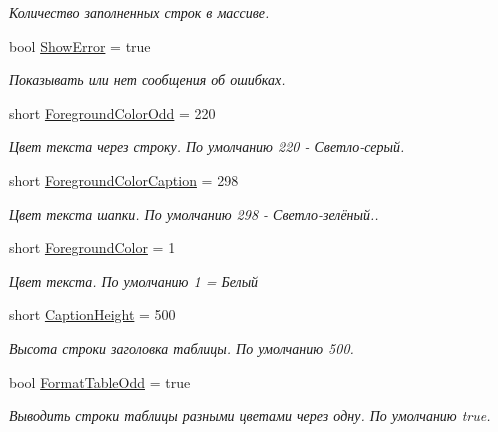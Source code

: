 \begin{DoxyCompactItemize}
\begin{DoxyCompactList}\small\item\em Количество заполненных строк в массиве. \end{DoxyCompactList}\item 
bool \mbox{\hyperlink{class_f_b_a_1_1_sys_report_x_l_s_x_a3a469063a5d17cb2ff4176e776cdaa1d}{Show\+Error}} = true
\begin{DoxyCompactList}\small\item\em Показывать или нет сообщения об ошибках. \end{DoxyCompactList}\item 
short \mbox{\hyperlink{class_f_b_a_1_1_sys_report_x_l_s_x_ab01e0cb21ac9395db05aff5aa8a73b78}{Foreground\+Color\+Odd}} = 220
\begin{DoxyCompactList}\small\item\em Цвет текста через строку. По умолчанию 220 -\/ Светло-\/серый. \end{DoxyCompactList}\item 
short \mbox{\hyperlink{class_f_b_a_1_1_sys_report_x_l_s_x_ad335a0125532d5c81d1a0f108ae564e1}{Foreground\+Color\+Caption}} = 298
\begin{DoxyCompactList}\small\item\em Цвет текста шапки. По умолчанию 298 -\/ Светло-\/зелёный.. \end{DoxyCompactList}\item 
short \mbox{\hyperlink{class_f_b_a_1_1_sys_report_x_l_s_x_ab4bbe5d69576bb5ccb1ab7a9de4ab781}{Foreground\+Color}} = 1
\begin{DoxyCompactList}\small\item\em Цвет текста. По умолчанию 1 = Белый \end{DoxyCompactList}\item 
short \mbox{\hyperlink{class_f_b_a_1_1_sys_report_x_l_s_x_a79c24ff3b7d11a7764ff00fe38c2af2f}{Caption\+Height}} = 500
\begin{DoxyCompactList}\small\item\em Высота строки заголовка таблицы. По умолчанию 500. \end{DoxyCompactList}\item 
bool \mbox{\hyperlink{class_f_b_a_1_1_sys_report_x_l_s_x_a54c864b3a3685a04399b493a02cfad47}{Format\+Table\+Odd}} = true
\begin{DoxyCompactList}\small\item\em Выводить строки таблицы разными цветами через одну. По умолчанию true. \end{DoxyCompactList}\item 

\end{DoxyCompactItemize}
